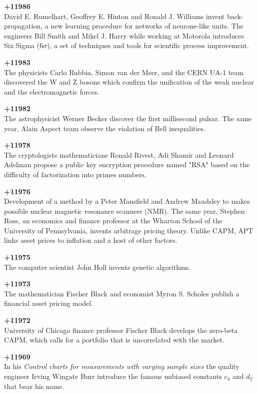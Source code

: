 \textbf{+11986}\\
David E. Rumelhart, Geoffrey E. Hinton and Ronald J. Williams invent back-propagation, a new learning procedure for networks of neurone-like units. The engineers Bill Smith and Mikel J. Harry while working at Motorola introduces Six Sigma ($6\sigma$), a set of techniques and tools for scientific process improvement.

\textbf{+11983}\\
The physicists Carlo Rubbia, Simon van der Meer, and the CERN UA-1 team discovered the W and Z bosons which confirm the unification of the weak nuclear and the electromagnetic forces.

\textbf{+11982}\\
The astrophysicist Werner Becker discover the first millisecond pulsar. The same year, Alain Aspect team observe the violation of Bell inequalities.

\textbf{+11978}\\
The cryptologists mathematicians Ronald Rivest, Adi Shamir and Leonard Adelman propose a public key encryption procedure named "RSA" based on the difficulty of factorization into primes numbers.

\textbf{+11976}\\
Development of a method by a Peter Mansfield and Andrew Maudsley to makes possible nuclear magnetic resonance scanners (NMR). The same year, Stephen Ross, an economics and finance professor at the Wharton School of the University of Pennsylvania, invents arbitrage pricing theory. Unlike CAPM, APT links asset prices to inflation and a host of other factors.

\textbf{+11975}\\
The computer scientist John Holl invents genetic algorithms.

\textbf{+11973}\\
The mathematician Fischer Black and economist Myron S. Scholes publish a financial asset pricing model.

\textbf{+11972}\\
University of Chicago finance professor Fischer Black develops the zero-beta CAPM, which calls for a portfolio that is uncorrelated with the market.

\textbf{+11969}\\
In his \textit{Control charts for measurements with varying sample sizes} the quality engineer Irving Wingate Burr introduce the famous unbiased constants $c_4$ and $d_2$ that bear his name.

